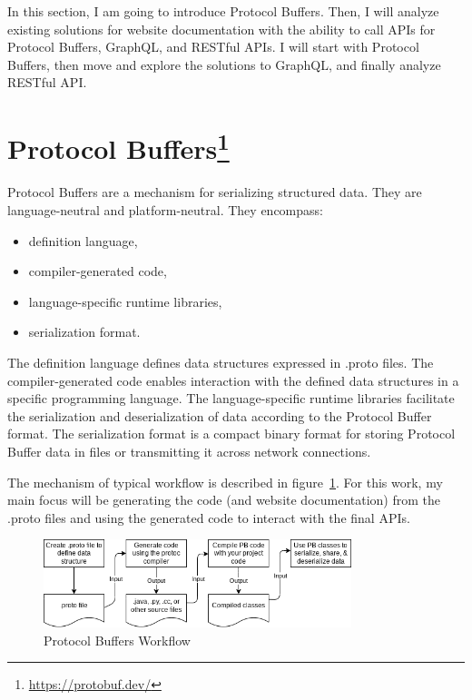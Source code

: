 In this section, I am going to introduce Protocol Buffers.
Then, I will analyze existing solutions for website documentation with the ability to call APIs for Protocol Buffers, GraphQL, and RESTful APIs.
I will start with Protocol Buffers, then move and explore the solutions to GraphQL, and finally analyze RESTful API\@.


\section{Protocol Buffers\footnote{\url{https://protobuf.dev/}}}
Protocol Buffers are a mechanism for serializing structured data.
They are language-neutral and platform-neutral.
They encompass:
\begin{itemize}
    \item definition language,
    \item compiler-generated code,
    \item language-specific runtime libraries,
    \item serialization format.
\end{itemize}
The definition language defines data structures expressed in .proto files.
The compiler-generated code enables interaction with the defined data structures in a specific programming language.
The language-specific runtime libraries facilitate the serialization and deserialization of data according to the Protocol Buffer format.
The serialization format is a compact binary format for storing Protocol Buffer data in files or transmitting it across network connections.
\cite{protobuf-overview}

The mechanism of typical workflow is described in figure~\ref{fig:protobuf-mechanism}.
For this work, my main focus will be generating the code (and website documentation) from the .proto files and using the generated code to interact with the final APIs.
\begin{figure}[hbt!]
    \centering
    \captionsetup{justification=centering}
    \includegraphics[width=0.8\textwidth]{images/protocol-buffers-concepts}
    \caption{Protocol Buffers Workflow~\cite{protobuf-overview}}
    \label{fig:protobuf-mechanism}
\end{figure}


